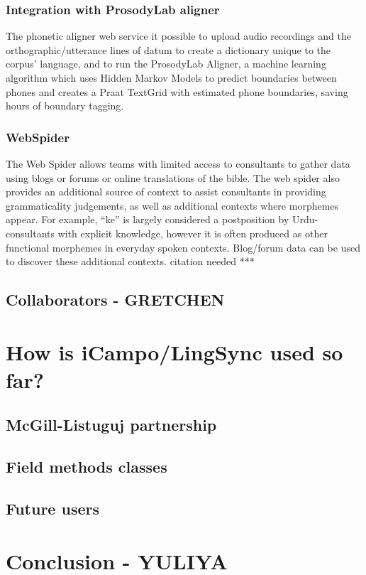 \documentclass[letterpaper, 12pt, dvips]{mitwpl}
\begin{document}
\subsubsection{Integration with ProsodyLab aligner}
\label{sec:phoneticwebservice}

The phonetic aligner web service it possible to upload audio recordings and the orthographic/utterance lines of datum to create a dictionary unique to the corpus' language, and to run the ProsodyLab Aligner, a machine learning algorithm which uses Hidden Markov Models to predict boundaries between phones and creates a Praat TextGrid with estimated phone boundaries, saving hours of boundary tagging.

\subsubsection{WebSpider}

The Web Spider allows teams with limited access to consultants to gather data using blogs or forums or online translations of the bible. The web spider also provides an additional source of context to assist consultants in providing grammaticality judgements, as well as additional contexts where morphemes appear. For example, ``ke'' is largely considered a postposition by Urdu-consultants with explicit knowledge, however it is often produced as other functional morphemes in everyday spoken contexts. Blog/forum data can be used to discover these additional contexts. citation needed ***


\subsection{Collaborators - GRETCHEN} 

\section{How is iCampo/LingSync used so far?} 

\subsection{McGill-Listuguj partnership}

\subsection{Field methods classes} 

\subsection{Future users} 

\section{Conclusion - YULIYA} 



\custombib{}
\end{document}
